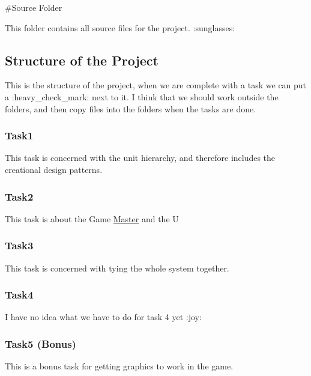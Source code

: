 \#\+Source Folder

This folder contains all source files for the project. \+:sunglasses\+:

\subsection*{Structure of the Project}

This is the structure of the project, when we are complete with a task we can put a \+:heavy\+\_\+check\+\_\+mark\+: next to it. I think that we should work outside the folders, and then copy files into the folders when the tasks are done.

\subsubsection*{Task1}

This task is concerned with the unit hierarchy, and therefore includes the creational design patterns.

\subsubsection*{Task2}

This task is about the Game \hyperlink{class_master}{Master} and the U

\subsubsection*{Task3}

This task is concerned with tying the whole system together.

\subsubsection*{Task4}

I have no idea what we have to do for task 4 yet \+:joy\+:

\subsubsection*{Task5 (Bonus)}

This is a bonus task for getting graphics to work in the game. 